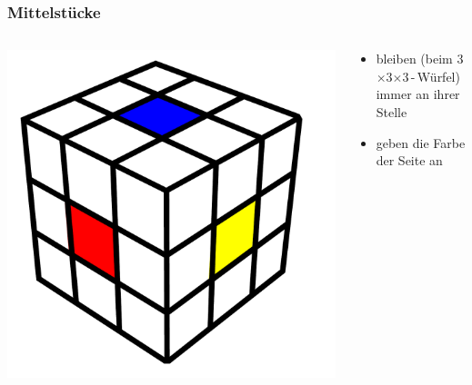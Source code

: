 \begin{frame}
	\frametitle{Mittelstücke}
	
	\begin{columns}[c]
		\begin{column}[C]{.5\textwidth}
			\center
			\includegraphics[scale=0.3]{img/middles}
		\end{column}
		\begin{column}[C]{.5\textwidth}
			\begin{itemize}
				\item bleiben (beim 3$\times$3$\times$3\,-\,Würfel) immer an ihrer Stelle
				\item geben die Farbe der Seite an
			\end{itemize}
		\end{column}
	\end{columns}	
	
\end{frame}

